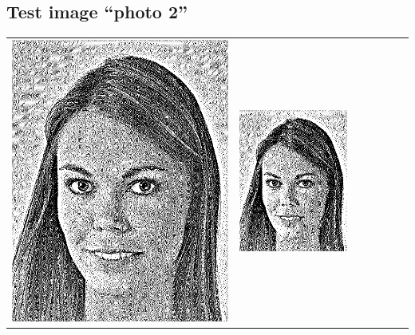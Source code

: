 \subsection{Test image ``photo 2''}
\begin{tabular}{lllllll}
	\includegraphics{Ediphoto-2-1.png} &
	\includegraphics{Ediphoto-2-2.png} &

\end{tabular}

